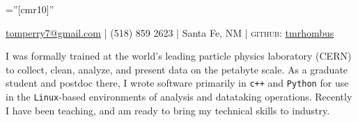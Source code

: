 \documentclass[letterpaper,12pt]{article} %
\begin{document}
\pagestyle{empty} %

\font\fb=''[cmr10]'' %


\par{\par} %
\par{\centering  \href{mailto:tomperry7@gmail.com}{tomperry7@gmail.com} | (518) 859 2623 | Santa Fe, NM | \textsc{github:} \href{https://www.github.com/tmrhombus}{tmrhombus}\par}

% 
% 

I was formally trained at the world's leading particle physics laboratory (CERN) to collect, clean, analyze, and present data on the petabyte scale. As a graduate student and postdoc there, I wrote software primarily in \texttt{c++} and \texttt{Python} for use in the \texttt{Linux}-based environments of analysis and datataking operations. Recently I have been teaching, and am ready to bring my technical skills to industry.
\end{document}
